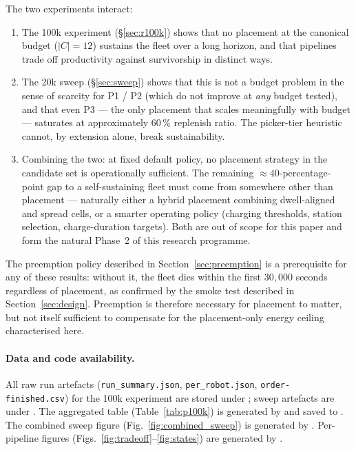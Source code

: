 \documentclass[conference]{IEEEtran}
\begin{document}
The two experiments interact:
\begin{enumerate}
  \item The 100k experiment (\S\ref{sec:r100k}) shows that no placement at the canonical budget ($|C| = 12$) sustains the fleet over a long horizon, and that pipelines trade off productivity against survivorship in distinct ways.
  \item The 20k sweep (\S\ref{sec:sweep}) shows that this is not a budget problem in the sense of scarcity for P1 / P2 (which do not improve at \emph{any} budget tested), and that even P3 --- the only placement that scales meaningfully with budget --- saturates at approximately $60\,\%$ replenish ratio. The picker-tier heuristic cannot, by extension alone, break sustainability.
  \item Combining the two: at fixed default policy, no placement strategy in the candidate set is operationally sufficient. The remaining ${\approx}40$-percentage-point gap to a self-sustaining fleet must come from somewhere other than placement --- naturally either a hybrid placement combining dwell-aligned and spread cells, or a smarter operating policy (charging thresholds, station selection, charge-duration targets). Both are out of scope for this paper and form the natural Phase~2 of this research programme.
\end{enumerate}

The preemption policy described in Section~\ref{sec:preemption} is a prerequisite for any of these results: without it, the fleet dies within the first $30{,}000$ seconds regardless of placement, as confirmed by the smoke test described in Section~\ref{sec:design}. Preemption is therefore necessary for placement to matter, but not itself sufficient to compensate for the placement-only energy ceiling characterised here.

\paragraph{Data and code availability.}
All raw run artefacts (\texttt{run\_summary.json}, \texttt{per\_robot.json}, \texttt{order-finished.csv}) for the 100k experiment are stored under ; sweep artefacts are under . The aggregated table (Table~\ref{tab:p100k}) is generated by  and saved to . The combined sweep figure (Fig.~\ref{fig:combined_sweep}) is generated by . Per-pipeline figures (Figs.~\ref{fig:tradeoff}--\ref{fig:states}) are generated by .
\end{document}
